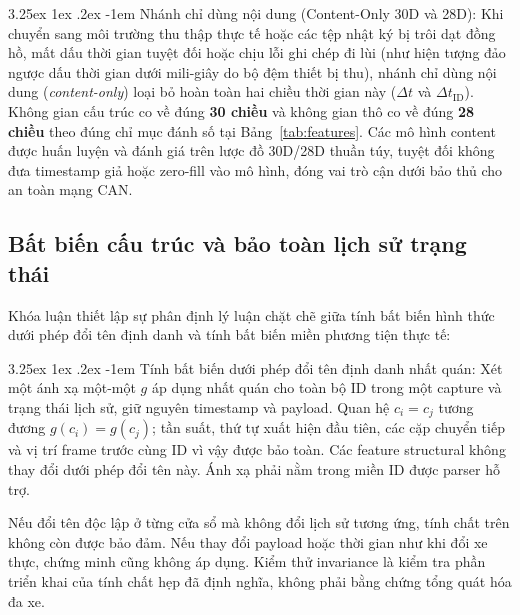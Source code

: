 \documentclass[12pt, a4paper, reqno, oneside]{book}
\makeatletter
\renewcommand\paragraph{\@startsection{paragraph}{5}{\z@}%
  {3.25ex \@plus1ex \@minus.2ex}%
  {-1em}%
  {\normalfont\normalsize\bfseries}}
\makeatother
\begin{document}
\paragraph{Nhánh chỉ dùng nội dung (Content-Only 30D và 28D):}\label{subsec:content-features-def}
Khi chuyển sang môi trường thu thập thực tế hoặc các tệp nhật ký bị trôi dạt đồng hồ, mất dấu thời gian tuyệt đối hoặc chịu lỗi ghi chép đi lùi (như hiện tượng đảo ngược dấu thời gian dưới mili-giây do bộ đệm thiết bị thu), nhánh chỉ dùng nội dung (\textit{content-only}) loại bỏ hoàn toàn hai chiều thời gian này ($\Delta t$ và $\Delta t_{\text{ID}}$). Không gian cấu trúc co về đúng \textbf{30 chiều} và không gian thô co về đúng \textbf{28 chiều} theo đúng chỉ mục đánh số tại Bảng~\ref{tab:features}. Các mô hình content được huấn luyện và đánh giá trên lược đồ 30D/28D thuần túy, tuyệt đối không đưa timestamp giả hoặc zero-fill vào mô hình, đóng vai trò cận dưới bảo thủ cho an toàn mạng CAN.

\subsection{Bất biến cấu trúc và bảo toàn lịch sử trạng thái}
Khóa luận thiết lập sự phân định lý luận chặt chẽ giữa tính bất biến hình thức dưới phép đổi tên định danh và tính bất biến miền phương tiện thực tế:

\paragraph{Tính bất biến dưới phép đổi tên định danh nhất quán:}
Xét một ánh xạ một-một $g$ áp dụng nhất quán cho toàn bộ ID trong một capture và trạng thái lịch sử, giữ nguyên timestamp và payload. Quan hệ $c_i=c_j$ tương đương $g(c_i)=g(c_j)$; tần suất, thứ tự xuất hiện đầu tiên, các cặp chuyển tiếp và vị trí frame trước cùng ID vì vậy được bảo toàn. Các feature structural không thay đổi dưới phép đổi tên này. Ánh xạ phải nằm trong miền ID được parser hỗ trợ.

Nếu đổi tên độc lập ở từng cửa sổ mà không đổi lịch sử tương ứng, tính chất trên không còn được bảo đảm. Nếu thay đổi payload hoặc thời gian như khi đổi xe thực, chứng minh cũng không áp dụng. Kiểm thử invariance là kiểm tra phần triển khai của tính chất hẹp đã định nghĩa, không phải bằng chứng tổng quát hóa đa xe.
\end{document}
